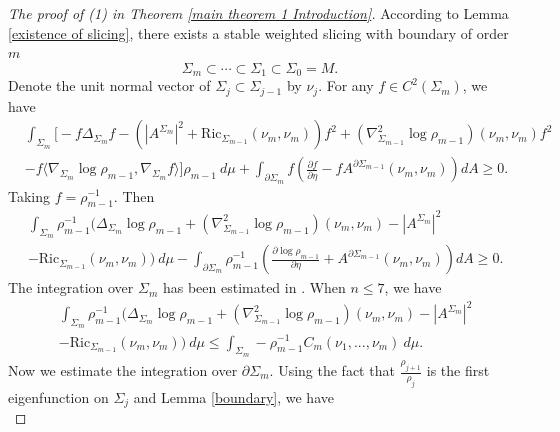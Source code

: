 \documentclass[11pt,letterpaper]{amsart}
\theoremstyle{definition}
\theoremstyle{remark}
\numberwithin{equation}{section}
\begin{document}
\begin{proof}[The proof of (1) in Theorem \ref{main theorem 1 Introduction}]
    According to Lemma \ref{existence of slicing}, there exists a stable weighted slicing with boundary of order $m$
    \[
    \Sigma_{m}\subset\cdots\subset \Sigma_{1}\subset\Sigma_{0}=M.
    \]
Denote the unit normal vector of $\Sigma_j\subset \Sigma_{j-1}$ by $\nu_{j}$.     For any $f\in C^{2}(\Sigma_{m})$, we have
    \[
    \begin{aligned}
        &\int_{\Sigma_{m}}\Big[-f\Delta_{\Sigma_{m}}f-(|A^{\Sigma_{m}}|^2+\text{Ric}_{\Sigma_{m-1}}(\nu_{m},\nu_{m}))f^2+(\nabla_{\Sigma_{m-1}}^{2}\log \rho_{m-1})(\nu_{m},\nu_{m})f^2\\
        &-f\langle \nabla_{\Sigma_{m}}\log \rho_{m-1},\nabla_{\Sigma_{m}}f\rangle\Big]\rho_{m-1} \ d\mu
        +\int_{\partial \Sigma_{m}}f(\frac{\partial f}{\partial \eta}-fA^{\partial \Sigma_{m-1}}(\nu_{m},\nu_{m})) dA\geq 0.
    \end{aligned}
    \]
    Taking $f=\rho_{m-1}^{-1}$. Then
    \begin{equation}\label{bottom term}
    \begin{aligned}
        &\int_{\Sigma_{m}}\rho_{m-1}^{-1}\big(\Delta_{\Sigma_{m}}\log \rho_{m-1} +(\nabla_{\Sigma_{m-1}}^{2}\log \rho_{m-1})(\nu_{m},\nu_{m})-|A^{\Sigma_{m}}|^2\\
        &-\text{Ric}_{\Sigma_{m-1}}(\nu_{m},\nu_{m})\big
        )\ d\mu -\int_{\partial \Sigma_{m}}\rho_{m-1}^{-1}(\frac{\partial \log \rho_{m-1}}{\partial \eta}+A^{\partial \Sigma_{m-1}}(\nu_{m},\nu_{m}))dA\geq 0.
    \end{aligned}
    \end{equation}
    The integration over $\Sigma_{m}$ has been
    estimated in \cite[Lemma 3.1]{brendlegeroch'sconjecture}. When $n\leq 7$, we have
    \[
    \begin{aligned}
        &\int_{\Sigma_{m}}\rho_{m-1}^{-1}\big(\Delta_{\Sigma_{m}}\log \rho_{m-1} +(\nabla_{\Sigma_{m-1}}^{2}\log \rho_{m-1})(\nu_{m},\nu_{m})-|A^{\Sigma_{m}}|^2\\
        &-\text{Ric}_{\Sigma_{m-1}}(\nu_{m},\nu_{m})\big
        )\ d\mu \leq \int_{\Sigma_{m}}-\rho_{m-1}^{-1}C_{m}(\nu_{1},...,\nu_{m})\ d\mu.
    \end{aligned}
    \]
    Now we estimate the integration over $\partial \Sigma_{m}$. Using the fact that $\frac{\rho_{j+1}}{\rho_{j}}$ is the first eigenfunction on $\Sigma_j$  and Lemma \ref{boundary}, we have
    \begin{equation}\label{eq1}

\end{equation}
\end{proof}
\end{document}
